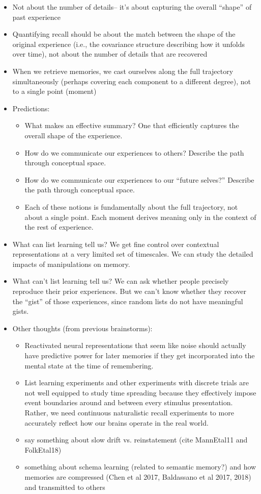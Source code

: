 \documentclass{article}
\begin{document}
\begin{itemize}
\item Not about the number of details-- it's about capturing the overall ``shape'' of past experience
\item Quantifying recall should be about the match between the shape of the original experience (i.e., the covariance structure describing how it unfolds over time), not about the number of details that are recovered
\item When we retrieve memories, we cast ourselves along the full trajectory simultaneously (perhaps covering each component to a different degree), not to a single point (moment)
\item Predictions:
\begin{itemize}
    \item What makes an effective summary?  One that efficiently captures the overall shape of the experience.
    \item How do we communicate our experiences to others?  Describe the path through conceptual space.
    \item How do we communicate our experiences to our ``future selves?''  Describe the path through conceptual space.
    \item Each of these notions is fundamentally about the full trajectory, not about a single point.  Each moment derives meaning only in the context of the rest of experience.
\end{itemize}
\item What can list learning tell us?  We get fine control over  contextual representations at a very limited set of timescales.  We can study the detailed impacts of manipulations on memory.
\item What can't list learning tell us?  We can ask whether people precisely reproduce their prior experiences.  But we can't know whether they recover the ``gist'' of those experiences, since random lists do not have meaningful gists.
\item Other thoughts (from previous brainstorms):
    \begin{itemize}
    \item Reactivated neural representations that seem like noise should actually have predictive power for later memories if they get incorporated into the mental state at the time of remembering.
    \item List learning experiments and other experiments with discrete trials are not well equipped to study time spreading because they effectively impose event boundaries around and between every stimulus presentation.  Rather, we need continuous naturalistic recall experiments to more accurately reflect how our brains operate in the real world.
    \item say something about slow drift vs. reinstatement (cite MannEtal11 and FolkEtal18)
    \item something about schema learning (related to semantic memory?) and how memories are compressed (Chen et al 2017, Baldassano et al 2017, 2018) and transmitted to others
    \end{itemize}
\end{itemize}
\end{document}
